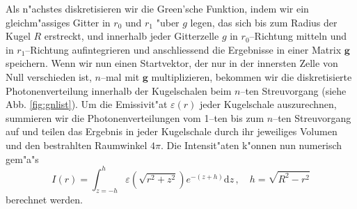 	Als n"achstes diskretisieren wir die Green'sche Funktion, indem wir ein gleichm"assiges Gitter in $r_0$ und $r_1$ "uber $g$ legen, das sich bis zum Radius der Kugel $R$ erstreckt, und innerhalb jeder Gitterzelle $g$ in $r_0$--Richtung mitteln und in $r_1$--Richtung aufintegrieren und anschliessend die Ergebnisse in einer Matrix $\mathbf{g}$ speichern. Wenn wir nun einen Startvektor, der nur in der innersten Zelle von Null verschieden ist, $n$--mal mit $\mathbf{g}$ multiplizieren, bekommen wir die diskretisierte Photonenverteilung innerhalb der Kugelschalen beim $n$--ten Streuvorgang (siehe Abb. \ref{fig:gnlist}). Um die Emissivit"at $\varepsilon(r)$ jeder Kugelschale auszurechnen, summieren wir die Photonenverteilungen vom 1--ten bis zum $n$--ten Streuvorgang auf und teilen das Ergebnis in jeder Kugelschale durch ihr jeweiliges Volumen und den bestrahlten Raumwinkel $4\pi$. Die Intensit"aten k"onnen nun numerisch gem"a"s
	\begin{equation}
		I(r) = \int_{z=-h}^h \varepsilon\left(\sqrt{r^2+z^2}\right) e^{-(z+h)}\text{d}z\,,\quad h=\sqrt{R^2-r^2}
		\label{eq:testprob_intensity_calculation}
	\end{equation}
	berechnet werden.
	
	
	
	\pagebreak
